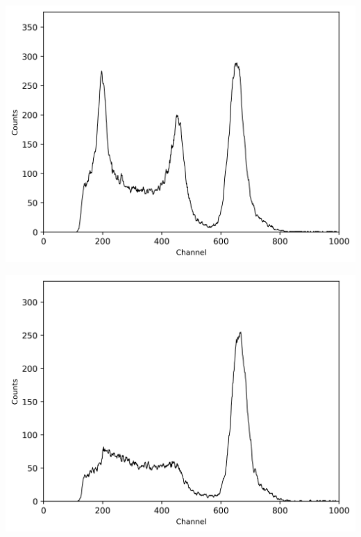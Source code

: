 \begin{multicols}{2}
\begin{center}
\begin{adjustbox}{max width=\linewidth, keepaspectratio}
        \end{adjustbox}
        \label{fig:SpectrumNight}
    \end{center}
\endminipage
%
\vspace{10mm}
%
\minipage{\linewidth}
    \begin{center}
        \captionsetup{type=figure}
        \begin{adjustbox}{max width=\linewidth, keepaspectratio}
            \includegraphics[]{png/137Cskoinz1}
        \end{adjustbox}
        \label{fig:137Cskoinz1}
    \end{center}
\endminipage
%
\vspace{10mm}
%
\minipage{\linewidth}
    \begin{center}
        \captionsetup{type=figure}
        \begin{adjustbox}{max width=\linewidth, keepaspectratio}
            \includegraphics[]{png/137Cskoinz2}

\end{adjustbox}
\end{center}
\end{multicols}
